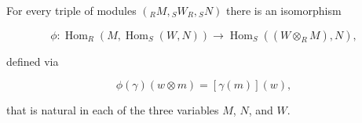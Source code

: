 For every triple of modules $({}_R M, {}_S W_R, {}_S N)$ there is an isomorphism

$$\phi: \operatorname{Hom}_R(M, \operatorname{Hom}_S(W, N)) \to \operatorname{Hom}_S((W \otimes_R M), N),$$

defined via

$$\phi(\gamma)(w \otimes m) = [\gamma(m)](w),$$

that is natural in each of the three variables $M$, $N$, and $W$.
